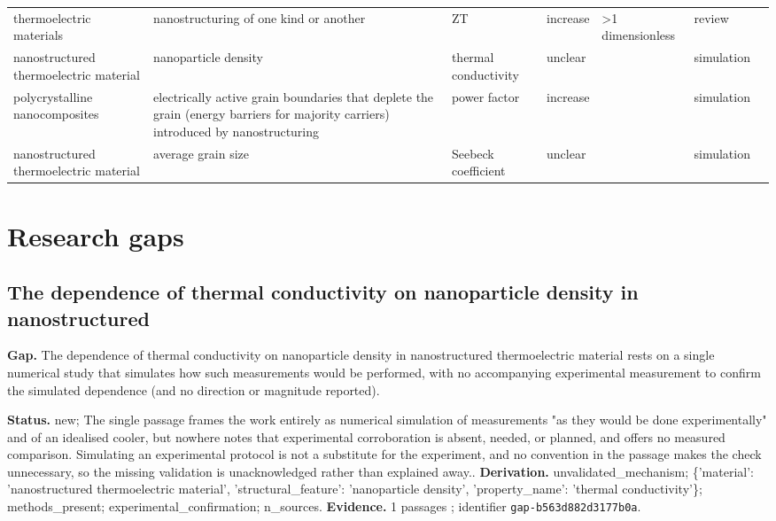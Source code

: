 \documentclass[11pt,a4paper]{article}
\begin{document}
\begin{longtable}{p{22mm}p{26mm}p{24mm}p{16mm}p{20mm}p{14mm}l}
thermoelectric materials & nanostructuring of one kind or another & ZT & increase & >1 dimensionless & review & \cite{LimitationsOfZtAsAFigure201962331153} \\
nanostructured thermoelectric material & nanoparticle density & thermal conductivity & unclear &  & simulation & \cite{LimitationsOfZtAsAFigure201962331153} \\
polycrystalline nanocomposites & electrically active grain boundaries that deplete the grain (energy barriers for majority carriers) introduced by nanostructuring & power factor & increase &  & simulation & \cite{LimitationsOfZtAsAFigure201962331153} \\
nanostructured thermoelectric material & average grain size & Seebeck coefficient & unclear &  & simulation & \cite{LimitationsOfZtAsAFigure201962331153} \\
\end{longtable}

\section{Research gaps}
\subsection*{The dependence of thermal conductivity on nanoparticle density in nanostructured}
\textbf{Gap.} The dependence of thermal conductivity on nanoparticle density in nanostructured thermoelectric material rests on a single numerical study that simulates how such measurements would be performed, with no accompanying experimental measurement to confirm the simulated dependence (and no direction or magnitude reported).

\textbf{Status.} new; The single passage frames the work entirely as numerical simulation of measurements "as they would be done experimentally" and of an idealised cooler, but nowhere notes that experimental corroboration is absent, needed, or planned, and offers no measured comparison. Simulating an experimental protocol is not a substitute for the experiment, and no convention in the passage makes the check unnecessary, so the missing validation is unacknowledged rather than explained away..
\textbf{Derivation.} unvalidated\_mechanism; \{'material': 'nanostructured thermoelectric material', 'structural\_feature': 'nanoparticle density', 'property\_name': 'thermal conductivity'\}; methods\_present; experimental\_confirmation; n\_sources.
\textbf{Evidence.} 1 passages \cite{LimitationsOfZtAsAFigure201962331153}; identifier \texttt{gap-b563d882d3177b0a}.
\end{document}
